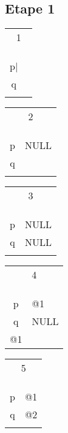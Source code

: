 \subsection{Etape 1}
\begin{tabular}{c|p{1cm}|}
	\multicolumn{2}{c|}{1}\\
	&\\
	\hline
	&\\	
	\hline
	&\\
	\hline
	\multicolumn{1}{c}{p|}&\\
	\hline
	q&\\
	\hline
	&\\	
	\hline
\end{tabular}
\begin{tabular}{c|p{1cm}|}
	\multicolumn{2}{c|}{2}\\
	&\\
	\hline
	&\\	
	\hline
	&\\
	\hline
	p&NULL\\
	\hline
	q&\\
	\hline
	&\\	
	\hline
\end{tabular}
\begin{tabular}{c|p{1cm}|}
	\multicolumn{2}{c|}{3}\\
	&\\
	\hline
	&\\	
	\hline
	&\\
	\hline
	p&NULL\\
	\hline
	q&NULL\\
	\hline
	&\\	
	\hline
\end{tabular}
\begin{tabular}{c|p{1cm}|}
	\multicolumn{2}{c|}{4}\\
	&\\
	\hline
	&\\	
	\hline
	&\\
	\hline
	p&@1\\
	\hline
	q&NULL\\
	\hline
	@1&\\	
	\hline
\end{tabular}
\begin{tabular}{c|p{1cm}|}
	\multicolumn{2}{c|}{5}\\
	&\\
	\hline
	&\\	
	\hline
	&\\
	\hline
	p&@1\\
	\hline
	q&@2\\
	\hline
	&\\	
	\hline
\end{tabular}
